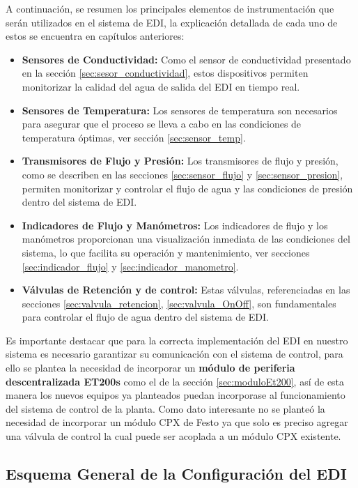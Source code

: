 A continuación, se resumen los principales elementos de instrumentación que serán utilizados en el sistema de EDI, la explicación detallada de cada uno de estos se encuentra en capítulos anteriores:
\begin{itemize}
      \item \textbf{Sensores de Conductividad:} Como el sensor de conductividad presentado en la sección \ref{sec:sesor_conductividad}, estos dispositivos permiten monitorizar la calidad del agua de salida del EDI en tiempo real.

      \item \textbf{Sensores de Temperatura:} Los sensores de temperatura son necesarios para asegurar que el proceso se lleva a cabo en las condiciones de temperatura óptimas, ver sección \ref{sec:sensor_temp}.

      \item \textbf{Transmisores de Flujo y Presión:} Los transmisores de flujo y presión, como se describen en las secciones \ref{sec:sensor_flujo} y \ref{sec:sensor_presion}, permiten monitorizar y controlar el flujo de agua y las condiciones de presión dentro del sistema de EDI.

      \item \textbf{Indicadores de Flujo y Manómetros:} Los indicadores de flujo y los manómetros proporcionan una visualización inmediata de las condiciones del sistema, lo que facilita su operación y mantenimiento, ver secciones \ref{sec:indicador_flujo} y \ref{sec:indicador_manometro}.

      \item \textbf{Válvulas de Retención y de control:} Estas válvulas, referenciadas en las secciones  \ref{sec:valvula_retencion}, \ref{sec:valvula_OnOff}, son fundamentales para controlar el flujo de agua dentro del sistema de EDI.
\end{itemize}
Es importante destacar que para la correcta implementación del EDI en nuestro sistema es necesario garantizar su comunicación con el sistema de control,
para ello se plantea la necesidad de incorporar un \textbf{módulo  de periferia descentralizada ET200s} como el de la sección \ref{sec:moduloEt200}, así de esta manera
los nuevos equipos ya planteados puedan incorporase al funcionamiento del sistema de control de la planta. Como dato interesante no se planteó la necesidad de incorporar
un módulo CPX de Festo ya que solo es preciso agregar una válvula de control la cual puede ser acoplada a un módulo CPX existente.

\subsection{Esquema General de la Configuración del EDI}

